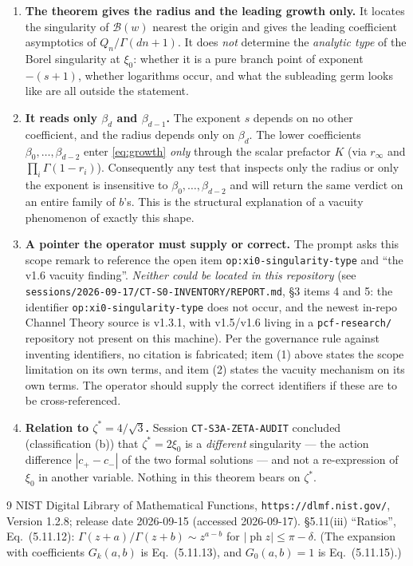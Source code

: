 \documentclass[11pt]{article}
\theoremstyle{definition}
\newcommand{\bd}{\beta_d}
\newcommand{\bdm}{\beta_{d-1}}
\newcommand{\rinf}{r_\infty}
\begin{document}
\begin{enumerate}
\item \textbf{The theorem gives the radius and the leading growth only.} It
locates the singularity of $\mathcal{B}(w)$ nearest the origin and gives the
leading coefficient asymptotics of $Q_n/\Gamma(dn+1)$. It does \emph{not}
determine the \emph{analytic type} of the Borel singularity at $\xi_0$: whether
it is a pure branch point of exponent $-(s+1)$, whether logarithms occur, and
what the subleading germ looks like are all outside the statement.
\item \textbf{It reads only $\bd$ and $\bdm$.} The exponent $s$ depends on no
other coefficient, and the radius depends only on $\bd$. The lower coefficients
$\beta_0,\dots,\beta_{d-2}$ enter \eqref{eq:growth} \emph{only} through the
scalar prefactor $K$ (via $\rinf$ and $\prod_i\Gamma(1-r_i)$). Consequently any
test that inspects only the radius or only the exponent is insensitive to
$\beta_0,\dots,\beta_{d-2}$ and will return the same verdict on an entire family
of $b$'s. This is the structural explanation of a vacuity phenomenon of exactly
this shape.
\item \textbf{A pointer the operator must supply or correct.} The prompt asks
this scope remark to reference the open item \texttt{op:xi0-singularity-type}
and ``the v1.6 vacuity finding''. \emph{Neither could be located in this
repository} (see \texttt{sessions/2026-09-17/CT-S0-INVENTORY/REPORT.md}, \S3
items 4 and 5: the identifier \texttt{op:xi0-singularity-type} does not occur,
and the newest in-repo Channel Theory source is v1.3.1, with v1.5/v1.6 living in
a \texttt{pcf-research/} repository not present on this machine). Per the
governance rule against inventing identifiers, no citation is fabricated; item
(1) above states the scope limitation on its own terms, and item (2) states the
vacuity mechanism on its own terms. The operator should supply the correct
identifiers if these are to be cross-referenced.
\item \textbf{Relation to $\zeta^*=4/\sqrt3$.} Session
\texttt{CT-S3A-ZETA-AUDIT} concluded (classification (b)) that $\zeta^*=2\xi_0$
is a \emph{different} singularity --- the action difference $|c_+-c_-|$ of the
two formal solutions --- and not a re-expression of $\xi_0$ in another variable.
Nothing in this theorem bears on $\zeta^*$.
\end{enumerate}

\begin{thebibliography}{9}
NIST Digital Library of Mathematical Functions, \texttt{https://dlmf.nist.gov/},
Version 1.2.8; release date 2026-09-15 (accessed 2026-09-17).
\S5.11(iii) ``Ratios'', Eq.~(5.11.12):
$\Gamma(z+a)/\Gamma(z+b)\sim z^{a-b}$ for
$|\operatorname{ph}z|\le\pi-\delta$. (The expansion with coefficients
$G_k(a,b)$ is Eq.~(5.11.13), and $G_0(a,b)=1$ is Eq.~(5.11.15).)
\end{thebibliography}
\end{document}
